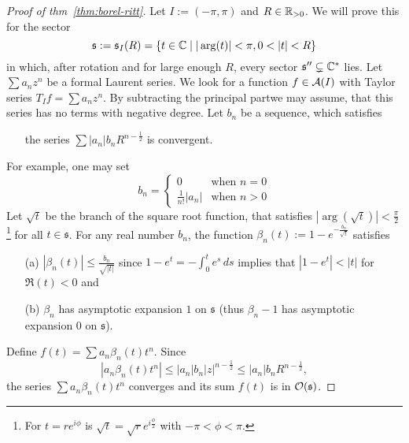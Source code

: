 \begin{proof}[Proof of thm~\ref{thm:borel-ritt}]
  Let $I:=(-\pi,\pi)$ and $R\in\mathbb{R}_{>0}$.
  We will prove this for the sector
  \[
    \mathfrak{s}:=\mathfrak{s}_{I}(R)=\left\{
      t\in\C\mid |\arg(t)|<\pi, 0<|t|<R
    \right\}
  \]
  in which, after rotation and for large enough $R$, every sector
  $\mathfrak{s}''\subsetneq\mathbb{C}^*$ lies.
  Let $\sum a_nz^n$ be a formal Laurent series. We look for a function
  $f\in\mathcal{A}(I)$ with Taylor series $T_{I}f=\sum a_nz^n$.
  By subtracting the principal part\TODO[?] we may assume, that this series has
  no terms with negative degree.
  Let $b_n$ be a sequence, which satisfies
  \begin{itemize}
    \item[] the series $\sum |a_n|b_nR^{n-\frac{1}{2}}$ is convergent.
  \end{itemize}
  For example, one may set
  \[
    b_n=\begin{cases}
      0                 & \text{when~} n=0
      \\\frac{1}{n!}|a_n| & \text{when~} n>0
    \end{cases}
  \]
  Let $\sqrt{t}$ be the branch of the square root function, that satisfies
  $|\arg(\sqrt{t})|<\frac{\pi}{2}$\footnote{For $t=re^{i\phi}$ is
  $\sqrt{t}=\sqrt{r}e^{i\frac{\phi}{2}}$ with $-\pi<\phi<\pi$.} for all
  $t\in\mathfrak{s}$.
  For any real number $b_n$, the function
  $\beta_n(t):=1-e^{-\frac{b_n}{\sqrt{t}}}$ satisfies
  \begin{enumerate}
    \item[(a)] $|\beta_n(t)|\leq\frac{b_n}{\sqrt{|t|}}$ since
      $1-e^t=-\int_0^te^s\,ds$ implies that $|1-e^t|<|t|$ for $\Re(t)<0$ and
    \item[(b)] $\beta_n$ has asymptotic expansion $1$ on $\mathfrak{s}$ (thus
      $\beta_n-1$ has asymptotic expansion $0$ on $\mathfrak{s}$).
  \end{enumerate}
  Define $f(t)=\sum a_n\beta_n(t)t^n$.
  Since 
  \[
    |a_n\beta_n(t)t^n|
    \leq|a_n|b_n|z|^{n-\frac{1}{2}}
    \leq|a_n|b_nR^{n-\frac{1}{2}},
  \]
  the series
  $\sum a_n\beta_n(t)t^n$ converges and its sum $f(t)$ is in
  $\mathcal{O}(\mathfrak{s})$.


\end{proof}
